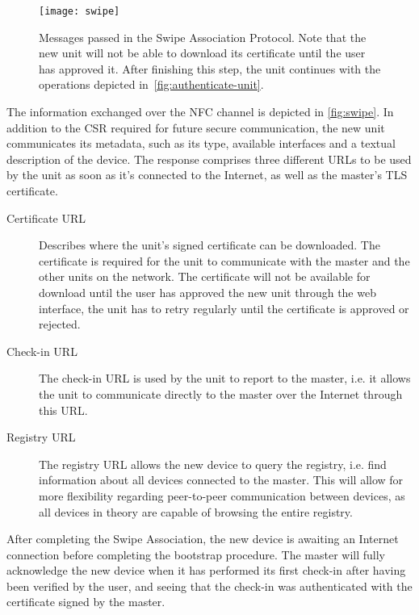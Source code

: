\begin{figure}[ht]
    \centering
    \texttt{[image: swipe]}
    \caption{Messages passed in the Swipe Association Protocol. Note that the new unit will not be able to download its certificate until the user has approved it. After finishing this step, the unit continues with the operations depicted in~\autoref{fig:authenticate-unit}.}
    \label{fig:swipe}
\end{figure}

The information exchanged over the NFC channel is depicted in \autoref{fig:swipe}. In addition to the CSR required for future secure communication, the new unit communicates its metadata, such as its type, available interfaces and a textual description of the device. The response comprises three different URLs to be used by the unit as soon as it's connected to the Internet, as well as the master's TLS certificate.

\begin{description}
\item[Certificate URL]
    Describes where the unit's signed certificate can be downloaded. The certificate is required for the unit to communicate with the master and the other units on the network. The certificate will not be available for download until the user has approved the new unit through the web interface, the unit has to retry regularly until the certificate is approved or rejected.
\item[Check-in URL]
    The check-in URL is used by the unit to report to the master, i.e. it allows the unit to communicate directly to the master over the Internet through this URL.
\item[Registry URL]
    The registry URL allows the new device to query the registry, i.e. find information about all devices connected to the master. This will allow for more flexibility regarding peer-to-peer communication between devices, as all devices in theory are capable of browsing the entire registry.
\end{description}

After completing the Swipe Association, the new device is awaiting an Internet connection before completing the bootstrap procedure. The master will fully acknowledge the new device when it has performed its first check-in after having been verified by the user, and seeing that the check-in was authenticated with the certificate signed by the master.

